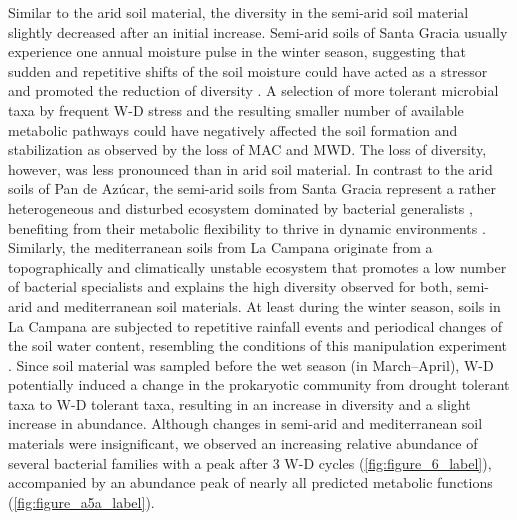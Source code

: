 Similar to the arid soil material, the diversity in the semi-arid soil material slightly decreased after an initial increase. 
Semi-arid soils of Santa Gracia usually experience one annual moisture pulse in the winter season, suggesting that sudden and repetitive shifts of the soil moisture could have acted as a stressor and promoted the reduction of diversity \citep{Clavel2011}. 
A selection of more tolerant microbial taxa by frequent W-D stress and the resulting smaller number of available metabolic pathways could have negatively affected the soil formation and stabilization \citep{Bestion2020, Shen2023} as observed by the loss of MAC and MWD. 
The loss of diversity, however, was less pronounced than in arid soil material. 
In contrast to the arid soils of Pan de Az{\'u}car, the semi-arid soils from Santa Gracia represent a rather heterogeneous and disturbed ecosystem dominated by bacterial generalists \citep{Rodriguez2022}, benefiting from their metabolic flexibility to thrive in dynamic environments \citep{Bai2021, ChenLeung2021, Hawkes2020}. 
Similarly, the mediterranean soils from La Campana originate from a topographically and climatically unstable ecosystem \citep{Rodriguez2022} that promotes a low number of bacterial specialists and explains the high diversity observed for both, semi-arid and mediterranean soil materials. 
At least during the winter season, soils in La Campana are subjected to repetitive rainfall events and periodical changes of the soil water content, resembling the conditions of this manipulation experiment \citep{Uebernickel2020}. 
Since soil material was sampled before the wet season (in March--April), W-D potentially induced a change in the prokaryotic community from drought tolerant taxa to W-D tolerant taxa, resulting in an increase in diversity and a slight increase in abundance. 
Although changes in semi-arid and mediterranean soil materials were insignificant, we observed an increasing relative abundance of several bacterial families with a peak after 3 W-D cycles (\cref{fig:figure_6_label}), accompanied by an abundance peak of nearly all predicted metabolic functions (\cref{fig:figure_a5a_label}).

